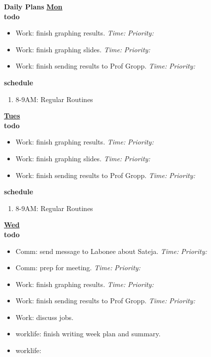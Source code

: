 \documentclass[11pt]{article}
\newcommand{\timeEst}[1]{\textit{Time:} \textit{#1}}
\newcommand{\priority}[1]{\textit{Priority:} \textit{#1}}
\newcommand{\deadline}[1]{#1}
\begin{document}
{\textbf{Daily Plans} 
\textbf{\small \underline{Mon}} \\
\textbf{\small todo} \\
\begin{itemize}
  \tiny \item \tiny Work: finish graphing results.  \deadline{ }   \timeEst{}  \priority{}
  \tiny \item \tiny Work: finish graphing slides.  \deadline{ }   \timeEst{}  \priority{}
  \tiny \item \tiny Work: finish sending results to Prof Gropp.  \deadline{ }   \timeEst{}  \priority{}  
\end{itemize}
\textbf{\small schedule} \\
  \begin{enumerate}
    \tiny \item \tiny 8-9AM: Regular Routines 
  \end{enumerate} 

\textbf{\small \underline{Tues}} \\
\textbf{\small todo} \\
\begin{itemize}
  \tiny \item \tiny Work: finish graphing results.  \deadline{ }   \timeEst{}  \priority{}
  \tiny \item \tiny Work: finish graphing slides.  \deadline{ }   \timeEst{}  \priority{}
  \tiny \item \tiny Work: finish sending results to Prof Gropp.  \deadline{ }   \timeEst{}  \priority{}  
\end{itemize}
\textbf{\small schedule} \\
  \begin{enumerate}
    \tiny \item \tiny 8-9AM: Regular Routines 
  \end{enumerate} 
\textbf{\small \underline{Wed}} \\
\textbf{\small todo} \\
\begin{itemize}
  \tiny \item \tiny Comm: send message to Labonee about Sateja. 
  \deadline{} \timeEst{} \priority{}  
  \tiny \item \tiny Comm: prep for meeting. \deadline{} \timeEst{} \priority{}  
  \item \tiny Work: finish graphing results.  \deadline{ }   \timeEst{}  \priority{}
  \item \tiny Work: finish sending results to Prof Gropp.  \deadline{ }   \timeEst{}  \priority{}  
  \item \tiny Work: discuss jobs.  
  \item \tiny worklife: finish writing week plan and summary. 
  \item \tiny worklife: 
\end{itemize}


}
\end{document}
